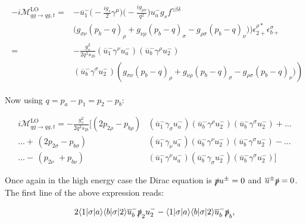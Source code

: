 			\begin{align}
			\begin{split}
				-i\mathcal{M}_{qg\rightarrow qg, t}^{\text{LO}} =&-\overline{u}^-_1\Bigg(-\frac{ig_s}{2}\gamma^\mu\Bigg)\Bigg(-\frac{ig_{\mu\nu}}{q^2}\Bigg)u^-_ag_sf^{\gamma\beta\delta}\\
				&\Big(g_{\sigma\nu}(p_b-q)_\rho + g_{\nu\rho}(p_b-q)_\sigma - g_{\rho\sigma}(p_b-q)_\nu)\Big)\epsilon^{\rho *}_{2+}\epsilon^{\sigma}_{b+}\\
				=&-\frac{g_s^2}{2q^2s_{2b}}\left(\overline{u}^-_1\gamma^{\nu}u^-_a\right)\left(\overline{u}^-_b\gamma^{\rho}u^-_2\right)\\
				&\left(\overline{u}^-_b\gamma^{\sigma}u^-_2\right)\left(g_{\sigma\nu}(p_b-q)_\rho + g_{\nu\rho}(p_b-q)_\sigma - g_{\rho\sigma}(p_b-q)_\nu)\right)
			\end{split}
			\end{align}

			Now using $q=p_a-p_1=p_2-p_b$:

			\begin{align*}
			i\mathcal{M}_{qg\rightarrow qg, t}^{\text{LO}} = -\frac{g_s^2}{2q^2s_{2b}}[(2p_{2\rho}-p_{b\rho})&\left(\overline{u}^-_1\gamma_{\sigma}u^-_a\right)\left(\overline{u}^-_b\gamma^{\rho}u^-_2\right)\left(\overline{u}^-_b\gamma^{\sigma}u^-_2\right)+\ldots \\
			\ldots + \hspace{2pt} (2p_{2\sigma}-p_{b\sigma})&\left(\overline{u}^-_1\gamma_{\nu}u^-_a\right)\left(\overline{u}^-_b\gamma^{\nu}u^-_2\right)\left(\overline{u}^-_b\gamma^{\sigma}u^-_2\right)-\ldots \\
			\ldots - \hspace{2pt} (p_{2\nu}\hspace{4pt}+p_{b\nu})&\left(\overline{u}^-_1\gamma^{\nu}u^-_a\right)\left(\overline{u}^-_b\gamma_{\sigma}u^-_2\right)\left(\overline{u}^-_b\gamma^{\sigma}u^-_2\right)]
			\end{align*}

			Once again in the high energy case the Dirac equation is $\slashed pu^\pm=0$ and $\overline{u}^\pm\slashed p=0$.  The first line of the above expression reads:

			\begin{equation}
			2\langle1|\sigma|a\rangle\langle b|\sigma|2\rangle\overline{u}^-_b\slashed p_2u^-_2 - \langle1|\sigma|a\rangle\langle b|\sigma|2\rangle\overline{u}^-_b\slashed p_b,
			\end{equation}

